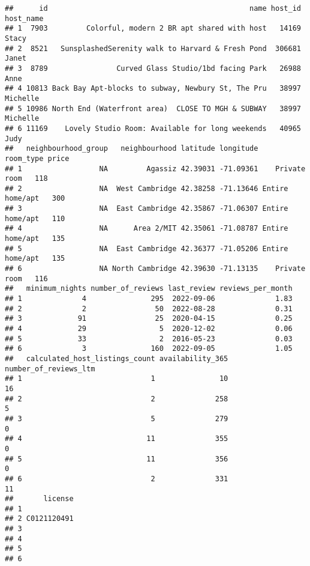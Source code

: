 \documentclass[
]{article}
\newenvironment{Shaded}{\begin{snugshade}}{\end{snugshade}}
\newcommand{\CommentTok}[1]{\textcolor[rgb]{0.56,0.35,0.01}{\textit{#1}}}
\newcommand{\FunctionTok}[1]{\textcolor[rgb]{0.00,0.00,0.00}{#1}}
\newcommand{\NormalTok}[1]{#1}
\newcommand{\OtherTok}[1]{\textcolor[rgb]{0.56,0.35,0.01}{#1}}
\newcommand{\SpecialCharTok}[1]{\textcolor[rgb]{0.00,0.00,0.00}{#1}}
\begin{document}
\begin{Shaded}
\end{Shaded}

\begin{verbatim}
##      id                                               name host_id host_name
## 1  7903         Colorful, modern 2 BR apt shared with host   14169     Stacy
## 2  8521   SunsplashedSerenity walk to Harvard & Fresh Pond  306681     Janet
## 3  8789                Curved Glass Studio/1bd facing Park   26988      Anne
## 4 10813 Back Bay Apt-blocks to subway, Newbury St, The Pru   38997  Michelle
## 5 10986 North End (Waterfront area)  CLOSE TO MGH & SUBWAY   38997  Michelle
## 6 11169    Lovely Studio Room: Available for long weekends   40965      Judy
##   neighbourhood_group   neighbourhood latitude longitude       room_type price
## 1                  NA         Agassiz 42.39031 -71.09361    Private room   118
## 2                  NA  West Cambridge 42.38258 -71.13646 Entire home/apt   300
## 3                  NA  East Cambridge 42.35867 -71.06307 Entire home/apt   110
## 4                  NA      Area 2/MIT 42.35061 -71.08787 Entire home/apt   135
## 5                  NA  East Cambridge 42.36377 -71.05206 Entire home/apt   135
## 6                  NA North Cambridge 42.39630 -71.13135    Private room   116
##   minimum_nights number_of_reviews last_review reviews_per_month
## 1              4               295  2022-09-06              1.83
## 2              2                50  2022-08-28              0.31
## 3             91                25  2020-04-15              0.25
## 4             29                 5  2020-12-02              0.06
## 5             33                 2  2016-05-23              0.03
## 6              3               160  2022-09-05              1.05
##   calculated_host_listings_count availability_365 number_of_reviews_ltm
## 1                              1               10                    16
## 2                              2              258                     5
## 3                              5              279                     0
## 4                             11              355                     0
## 5                             11              356                     0
## 6                              2              331                    11
##       license
## 1            
## 2 C0121120491
## 3            
## 4            
## 5            
## 6
\end{verbatim}
\end{document}
